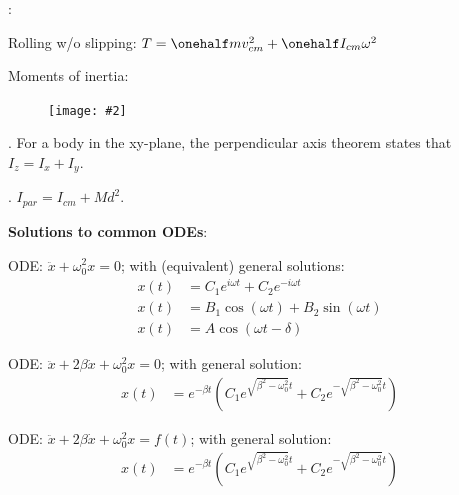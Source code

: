 \documentclass[10pt, twocolumn]{article}
\newcommand\myfig[2][0.3\textwidth]{\begin{figure}[h!]\centering\texttt{[image: \#2]}\end{figure}}
\newcommand{\myspace}{\vspace{3\bigskipamount}}
\newcommand\p{\Needspace{10\baselineskip} \noindent}
\begin{document}
\myspace
\p {}:
\begin{compactitem}
	\item Rolling w/o slipping: $T = \onehalf m v_{cm}^2 + \onehalf I_{cm} \omega^2$
	\item Moments of inertia: \myfig{InertiaList.PNG}
	\item {}. For a body in the xy-plane, the perpendicular axis theorem states that $I_z = I_x + I_y$. 
	\item {}. $I_{par} = I_{cm} + Md^2$. 
	\item \textbf{Solutions to common ODEs}:
	\begin{compactitem}[--]
		\item ODE: $ \ddot x + \omega_0^2 x = 0$; with (equivalent) general solutions:
		\begin{align}
			x(t) &= C_1 e^{i\omega t} + C_2 e^{ - i\omega t} \\
			x(t) &= B_1 \cos(\omega t) + B_2 \sin(\omega t) \\
			x(t) &= A\cos(\omega t - \delta)
		\end{align}
		
		\item ODE: $ \ddot x + 2 \beta\dot x + \omega_0^2 x = 0$; with general solution:
		\begin{align}
			x(t) &= e^{- \beta t} \left(C_1 e^{\sqrt{\beta^2 - \omega_0^2} t} +  C_2 e^{-\sqrt{\beta^2 - \omega_0^2} t}\right)
		\end{align}
		
		\item ODE: $ \ddot x + 2 \beta\dot x + \omega_0^2 x = f(t)$; with general solution:
		\begin{align}
			x(t) &= e^{- \beta t} \left(C_1 e^{\sqrt{\beta^2 - \omega_0^2} t} +  C_2 e^{-\sqrt{\beta^2 - \omega_0^2} t}\right)
		\end{align}
	\end{compactitem}
\end{compactitem}
\end{document}
